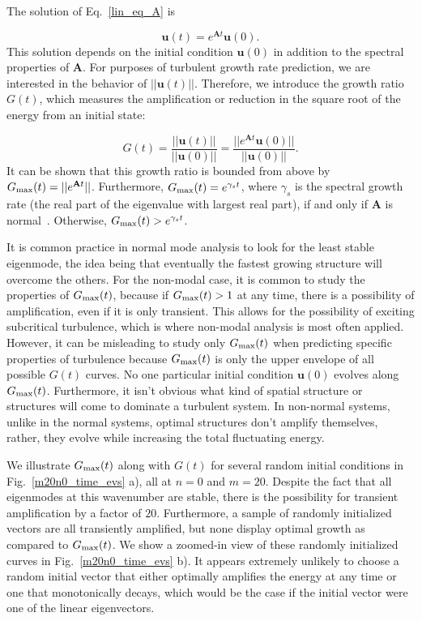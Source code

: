 \documentclass[letter,scriptaddress,twocolumn, prl,showkeys]{revtex4}
\def\beq{\begin{equation}}
\def\eeq{\end{equation}}
\begin{document}
The solution of Eq.~\ref{lin_eq_A} is

\beq
\label{lin_soln}
\mathbf{u}(t) = e^{\mathbf{A} t} \mathbf{u}(0).
\eeq
This solution depends on the initial condition $\mathbf{u}(0)$ in addition to the spectral properties of $\mathbf{A}$. For purposes of turbulent growth rate prediction, we are interested in
the behavior of $||\mathbf{u}(t)||$. Therefore, we introduce the growth ratio $G(t)$, which measures the amplification or reduction in the square root of the energy from an initial state:

\beq
\label{g_def}
G(t) = \frac{||\mathbf{u}(t)||}{||\mathbf{u}(0)||} = \frac{||e^{\mathbf{A} t} \mathbf{u}(0)||}{||\mathbf{u}(0)||}.
\eeq
It can be shown that this growth ratio is bounded from above by $G_{\rm{max}}(t) = ||e^{\mathbf{A} t}||$. Furthermore, $G_{\rm{max}}(t) = e^{\gamma_s t}$, where $\gamma_s$ is the spectral growth rate
(the real part of the eigenvalue with largest real part), if and only if $\mathbf{A}$ is normal~\cite{schmid2007}. Otherwise, $G_{\rm{max}}(t) > e^{\gamma_s t}$. 

It is common practice in normal mode analysis to look for the least stable eigenmode, the idea being that eventually the fastest growing structure will overcome the others.
For the non-modal case, it is common to study the properties of $G_{\rm{max}}(t)$, because if $G_{\rm{max}}(t) > 1$ at any time, there is a possibility of amplification, even if it is only transient.
This allows for the possibility of exciting subcritical turbulence, which is where non-modal analysis is most often applied. 
However, it can be misleading to study only $G_{\rm{max}}(t)$ when predicting specific properties of turbulence because
$G_{\rm{max}}(t)$ is only the upper envelope of all possible $G(t)$ curves. No one particular initial condition $\mathbf{u}(0)$ evolves along $G_{\rm{max}}(t)$. 
Furthermore, it isn't obvious what kind of spatial structure or structures will come to dominate a turbulent system. 
In non-normal systems, unlike in the normal systems, optimal structures don't amplify themselves, rather, they evolve while increasing the total fluctuating energy.

We illustrate $G_{\rm{max}}(t)$ along with $G(t)$ for several random initial conditions in Fig.~\ref{m20n0_time_evs} a), all at $n=0$ and $m=20$. Despite the fact that all eigenmodes at this
wavenumber are stable, there is the possibility for transient amplification by a factor of $20$. Furthermore, a sample of randomly initialized vectors are all transiently amplified, but none display
optimal growth as compared to $G_{\rm{max}}(t)$. We show a zoomed-in view of these randomly initialized curves in Fig.~\ref{m20n0_time_evs} b).
It appears extremely unlikely to choose a random initial vector that either optimally amplifies the energy at any time or one that monotonically decays, which would be the case
if the initial vector were one of the linear eigenvectors. 
\end{document}
